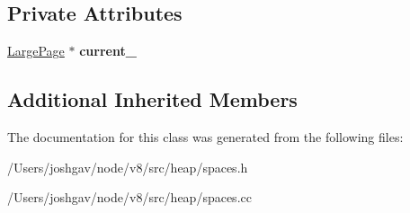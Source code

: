 \subsection*{Private Attributes}
\begin{DoxyCompactItemize}
\item 
\hyperlink{classv8_1_1internal_1_1_large_page}{Large\+Page} $\ast$ {\bfseries current\+\_\+}\hypertarget{classv8_1_1internal_1_1_large_object_iterator_a3f2025ffeb738106d9c5b1d4898e683f}{}\label{classv8_1_1internal_1_1_large_object_iterator_a3f2025ffeb738106d9c5b1d4898e683f}

\end{DoxyCompactItemize}
\subsection*{Additional Inherited Members}


The documentation for this class was generated from the following files\+:\begin{DoxyCompactItemize}
\item 
/\+Users/joshgav/node/v8/src/heap/spaces.\+h\item 
/\+Users/joshgav/node/v8/src/heap/spaces.\+cc\end{DoxyCompactItemize}
